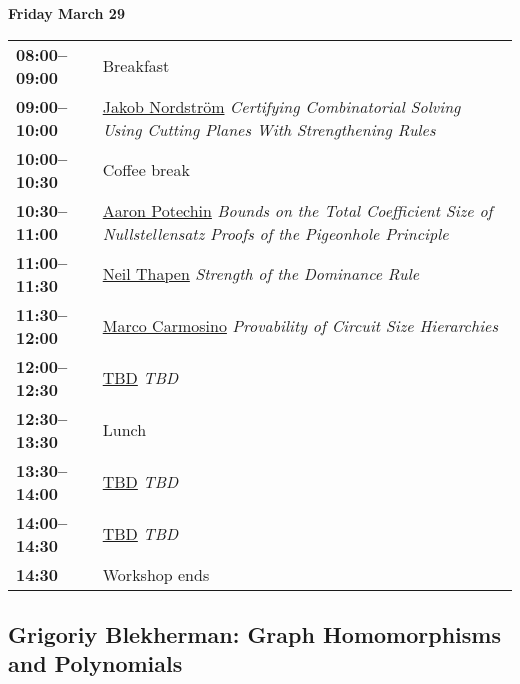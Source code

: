 \documentclass[11pt]{article}
\newcommand{\scheduletablewidth}{5.06in}
\begin{document}
\noindent\begin{minipage}{\textwidth}
\begin{center} {\bf\large Friday March 29} \end{center}
\begin{tabular}{ p{0.9in} p{\scheduletablewidth} }

{\bf 08:00--09:00}  & Breakfast\\

{\bf 09:00--10:00} & \hyperref[Nordstrom]{Jakob Nordstr\"{o}m}
{\em Certifying Combinatorial Solving Using Cutting Planes With Strengthening Rules} \\

{\bf 10:00--10:30} & {Coffee break} \\

{\bf 10:30--11:00} & \hyperref[Potechin]{Aaron Potechin}
{\em Bounds on the Total Coefficient Size of Nullstellensatz Proofs of the Pigeonhole Principle} \\

{\bf 11:00--11:30} & \hyperref[Thapen2]{Neil Thapen}
{\em Strength of the Dominance Rule} \\

{\bf 11:30--12:00} & \hyperref[Carmosino]{Marco Carmosino}
{\em Provability of Circuit Size Hierarchies} \\

{\bf 12:00--12:30} & \hyperref[TBDFri1200]{TBD}
{\em TBD} \\



{\bf 12:30--13:30
} &  Lunch\\

{\bf 13:30--14:00} &  \hyperref[TBDFri1400]{TBD}
{\em TBD} \\

{\bf 14:00--14:30} & \hyperref[TBDFri1400]{TBD}
{\em TBD} \\

{\bf 14:30%
} & Workshop ends \\
\end{tabular}
\end{minipage}


\pagebreak



\subsection*{Grigoriy Blekherman: Graph Homomorphisms and Polynomials}\label{Blekherman}
\end{document}
